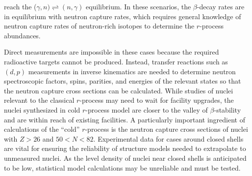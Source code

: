 {%
 reach the ($\gamma,n)\rightleftharpoons(n,\gamma)$ equilibrium. In these scenarios, the $\beta$-decay rates are in equilibrium with neutron capture rates, which %
 requires general knowledge of neutron capture rates of neutron-rich isotopes to determine the  $r$-process abundances.


Direct measurements are impossible in these cases because  the required radioactive targets cannot be produced. Instead, transfer reactions such as $(d,p)$ measurements in inverse kinematics are needed to determine neutron spectroscopic factors, spins, parities, and energies of the relevant states so that the neutron capture cross sections can be calculated.
While studies of nuclei relevant to the classical $r$-process may need to wait for facility upgrades, the nuclei synthesized in cold %
$r$-process model %
are closer to the valley of $\beta$-stability %
and are %
within reach %
of existing facilities.
A particularly important ingredient of calculations of the ``cold'' $r$-process %
is
the neutron capture cross sections of nuclei with $Z>26$ and $50<N<82$. Experimental data for cases around closed shells are vital for ensuring the reliability of structure models needed to extrapolate to unmeasured nuclei. As the level density of nuclei near closed shells is anticipated to be low, statistical model calculations may be unreliable and must be tested. %

\rhead{\desctext{\statename}}

}
